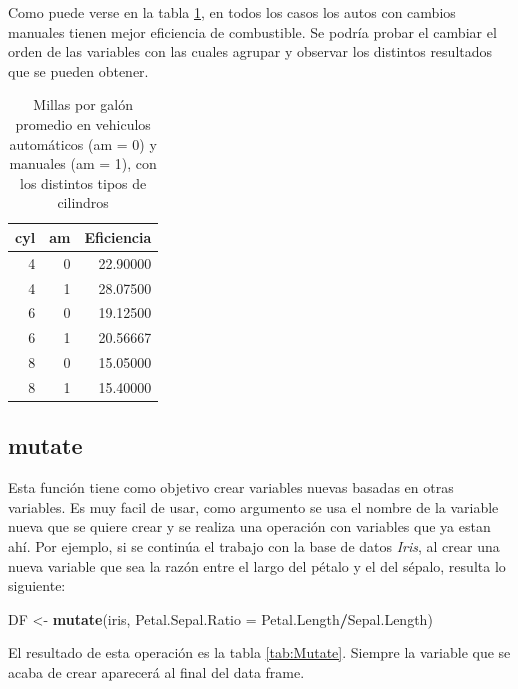 \documentclass[]{book}
\newenvironment{Shaded}{\begin{snugshade}}{\end{snugshade}}
\newcommand{\DataTypeTok}[1]{\textcolor[rgb]{0.13,0.29,0.53}{#1}}
\newcommand{\KeywordTok}[1]{\textcolor[rgb]{0.13,0.29,0.53}{\textbf{#1}}}
\newcommand{\NormalTok}[1]{#1}
\newcommand{\OperatorTok}[1]{\textcolor[rgb]{0.81,0.36,0.00}{\textbf{#1}}}
\newcommand{\StringTok}[1]{\textcolor[rgb]{0.31,0.60,0.02}{#1}}
\begin{document}
Como puede verse en la tabla \ref{tab:Eficienciatab}, en todos los casos
los autos con cambios manuales tienen mejor eficiencia de combustible.
Se podría probar el cambiar el orden de las variables con las cuales
agrupar y observar los distintos resultados que se pueden obtener.

\begin{table}

\caption{\label{tab:Eficienciatab}Millas por galón promedio en vehiculos automáticos (am = 0) y manuales (am = 1), con los distintos tipos de cilindros}
\centering
\begin{tabular}[t]{rrr}
\toprule
cyl & am & Eficiencia\\
\midrule
4 & 0 & 22.90000\\
4 & 1 & 28.07500\\
6 & 0 & 19.12500\\
6 & 1 & 20.56667\\
8 & 0 & 15.05000\\
8 & 1 & 15.40000\\
\bottomrule
\end{tabular}
\end{table}

\hypertarget{mutate}{%
\subsection{mutate}\label{mutate}}

Esta función tiene como objetivo crear variables nuevas basadas en otras
variables. Es muy facil de usar, como argumento se usa el nombre de la
variable nueva que se quiere crear y se realiza una operación con
variables que ya estan ahí. Por ejemplo, si se continúa el trabajo con
la base de datos \emph{Iris}, al crear una nueva variable que sea la
razón entre el largo del pétalo y el del sépalo, resulta lo siguiente:

\begin{Shaded}
\begin{Highlighting}[]
\NormalTok{DF <-}\StringTok{ }\KeywordTok{mutate}\NormalTok{(iris, }\DataTypeTok{Petal.Sepal.Ratio =}\NormalTok{ Petal.Length}\OperatorTok{/}\NormalTok{Sepal.Length)}
\end{Highlighting}
\end{Shaded}

El resultado de esta operación es la tabla \ref{tab:Mutate}. Siempre la
variable que se acaba de crear aparecerá al final del data frame.
\end{document}

